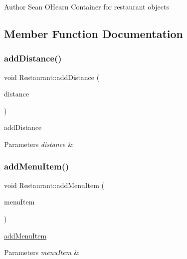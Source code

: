 \begin{DoxyAuthor}{Author}
Sean O\textquotesingle{}Hearn Container for restaurant objects 
\end{DoxyAuthor}


\subsection{Member Function Documentation}
\mbox{\label{class_restaurant_a35210fa764ffb3ec4c9563c3bb12fd68}} 
\subsubsection{\texorpdfstring{add\+Distance()}{addDistance()}}
{\footnotesize\ttfamily void Restaurant\+::add\+Distance (\begin{DoxyParamCaption}\item[{\hyperlink{class_distance}{Distance}}]{distance }\end{DoxyParamCaption})}



add\+Distance 


\begin{DoxyParams}{Parameters}
{\em distance} & \\
\hline
\end{DoxyParams}
\mbox{\label{class_restaurant_a5e743b42c3d5277a5c30728e5a6010f0}} 
\subsubsection{\texorpdfstring{add\+Menu\+Item()}{addMenuItem()}}
{\footnotesize\ttfamily void Restaurant\+::add\+Menu\+Item (\begin{DoxyParamCaption}\item[{\hyperlink{class_menu_item}{Menu\+Item}}]{menu\+Item }\end{DoxyParamCaption})}



\hyperlink{classadd_menu_item}{add\+Menu\+Item} 


\begin{DoxyParams}{Parameters}
{\em menu\+Item} & \\
\hline
\end{DoxyParams}
\mbox{\label{class_restaurant_a328d55dfff742bf89d6b81a01bab35d9}} 
